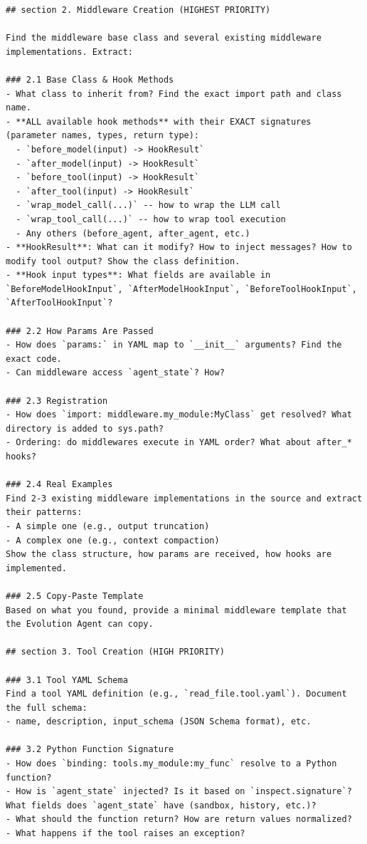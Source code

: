\begin{tcolorbox}
\begin{lstlisting}
## section 2. Middleware Creation (HIGHEST PRIORITY)

Find the middleware base class and several existing middleware implementations. Extract:

### 2.1 Base Class & Hook Methods
- What class to inherit from? Find the exact import path and class name.
- **ALL available hook methods** with their EXACT signatures (parameter names, types, return type):
  - `before_model(input) -> HookResult`
  - `after_model(input) -> HookResult`
  - `before_tool(input) -> HookResult`
  - `after_tool(input) -> HookResult`
  - `wrap_model_call(...)` -- how to wrap the LLM call
  - `wrap_tool_call(...)` -- how to wrap tool execution
  - Any others (before_agent, after_agent, etc.)
- **HookResult**: What can it modify? How to inject messages? How to modify tool output? Show the class definition.
- **Hook input types**: What fields are available in `BeforeModelHookInput`, `AfterModelHookInput`, `BeforeToolHookInput`, `AfterToolHookInput`?

### 2.2 How Params Are Passed
- How does `params:` in YAML map to `__init__` arguments? Find the exact code.
- Can middleware access `agent_state`? How?

### 2.3 Registration
- How does `import: middleware.my_module:MyClass` get resolved? What directory is added to sys.path?
- Ordering: do middlewares execute in YAML order? What about after_* hooks?

### 2.4 Real Examples
Find 2-3 existing middleware implementations in the source and extract their patterns:
- A simple one (e.g., output truncation)
- A complex one (e.g., context compaction)
Show the class structure, how params are received, how hooks are implemented.

### 2.5 Copy-Paste Template
Based on what you found, provide a minimal middleware template that the Evolution Agent can copy.

## section 3. Tool Creation (HIGH PRIORITY)

### 3.1 Tool YAML Schema
Find a tool YAML definition (e.g., `read_file.tool.yaml`). Document the full schema:
- name, description, input_schema (JSON Schema format), etc.

### 3.2 Python Function Signature
- How does `binding: tools.my_module:my_func` resolve to a Python function?
- How is `agent_state` injected? Is it based on `inspect.signature`? What fields does `agent_state` have (sandbox, history, etc.)?
- What should the function return? How are return values normalized?
- What happens if the tool raises an exception?


\end{lstlisting}
\end{tcolorbox}
